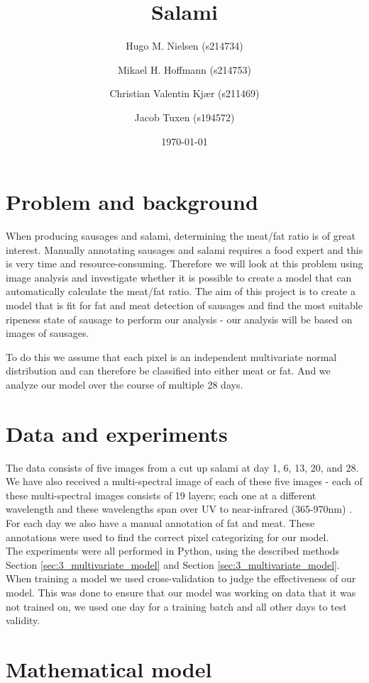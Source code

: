 \documentclass{article}
\title{Salami}
\author{Hugo M. Nielsen (s214734) \and Mikael H. Hoffmann (s214753) \and Christian Valentin Kjær (s211469) \and Jacob Tuxen (s194572)}
\date{\today}
\begin{document}
\maketitle
\section{Problem and background}
When producing sausages and salami, determining the meat/fat ratio is of great interest. Manually annotating sausages and salami requires a food expert and this is very time and resource-consuming. 
Therefore we will look at this problem using image analysis and investigate whether it is possible to create a model that can automatically calculate the meat/fat ratio. The aim of this project is to create a model that is fit for fat and meat detection of sausages and find the most suitable ripeness state of sausage to perform our analysis - our analysis will be based on images of sausages.

To do this we assume that each pixel is an independent multivariate normal distribution and can therefore be classified into either meat or fat. And we analyze our model over the course of multiple 28 days.

 
\section{Data and experiments}
The data consists of five images from a cut up salami at day 1, 6, 13, 20, and 28. We have also received a multi-spectral image of each of these five images - each of these multi-spectral images consists of 19 layers; each one at a different wavelength and these wavelengths span over UV to near-infrared (365-970nm) \cite{Videometer}.
For each day we also have a manual annotation of fat and meat. These annotations were used to find the correct pixel categorizing for our model.\\
The experiments were all performed in Python, using the described methods Section \ref{sec:3_multivariate_model} and Section \ref{sec:3_multivariate_model}.
When training a model we used cross-validation to judge the effectiveness of our model. This was done to ensure that our model was working on data that it was not trained on, we used one day for a training batch and all other days to test validity.


\section{Mathematical model}
\end{document}
